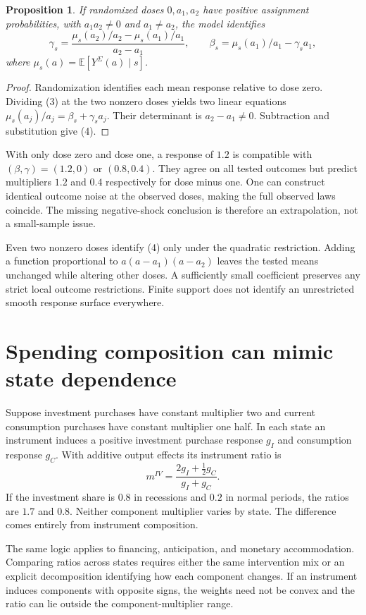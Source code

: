 \documentclass[11pt,a4paper]{article}
\newtheorem{proposition}[theorem]{Proposition}
\newcommand{\E}{\mathbb E}
\begin{document}
\begin{proposition}
If randomized doses $0,a_1,a_2$ have positive assignment probabilities, with $a_1a_2\ne0$ and $a_1\ne a_2$, the model identifies
\[
 \gamma_s=
 \frac{\mu_s(a_2)/a_2-\mu_s(a_1)/a_1}{a_2-a_1},
 \qquad
 \beta_s=\mu_s(a_1)/a_1-\gamma_sa_1,
 \tag{4}
\]
where $\mu_s(a)=\E[Y^\Sigma(a)\mid s]$.
\end{proposition}
\begin{proof}
Randomization identifies each mean response relative to dose zero. Dividing (3) at the two nonzero doses yields two linear equations
$\mu_s(a_j)/a_j=\beta_s+\gamma_sa_j$. Their determinant is $a_2-a_1\ne0$. Subtraction and substitution give (4).
\end{proof}
With only dose zero and dose one, a response of $1.2$ is compatible with $(\beta,\gamma)=(1.2,0)$ or $(0.8,0.4)$. They agree on all tested outcomes but predict multipliers $1.2$ and $0.4$ respectively for dose minus one. One can construct identical outcome noise at the observed doses, making the full observed laws coincide. The missing negative-shock conclusion is therefore an extrapolation, not a small-sample issue.

Even two nonzero doses identify (4) only under the quadratic restriction. Adding a function proportional to $a(a-a_1)(a-a_2)$ leaves the tested means unchanged while altering other doses. A sufficiently small coefficient preserves any strict local outcome restrictions. Finite support does not identify an unrestricted smooth response surface everywhere.
\section{Spending composition can mimic state dependence}
Suppose investment purchases have constant multiplier two and current consumption purchases have constant multiplier one half. In each state an instrument induces a positive investment purchase response $g_I$ and consumption response $g_C$. With additive output effects its instrument ratio is
\[
 m^{IV}=\frac{2g_I+\tfrac12g_C}{g_I+g_C}.
\]
If the investment share is $0.8$ in recessions and $0.2$ in normal periods, the ratios are $1.7$ and $0.8$. Neither component multiplier varies by state. The difference comes entirely from instrument composition.

The same logic applies to financing, anticipation, and monetary accommodation. Comparing ratios across states requires either the same intervention mix or an explicit decomposition identifying how each component changes. If an instrument induces components with opposite signs, the weights need not be convex and the ratio can lie outside the component-multiplier range.
\end{document}
